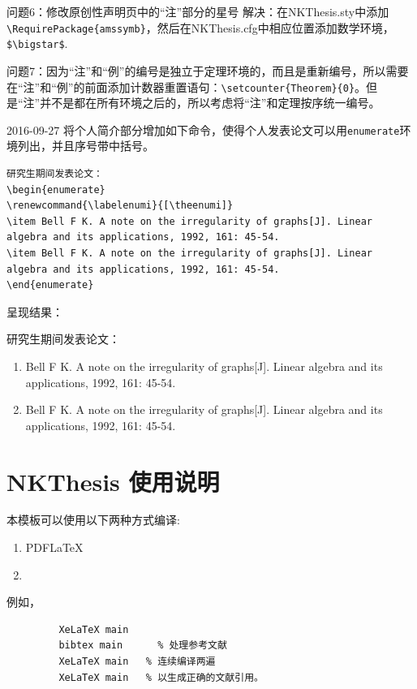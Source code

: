 问题6：修改原创性声明页中的“注”部分的星号
解决：在NKThesis.sty中添加\verb|\RequirePackage{amssymb}|，然后在NKThesis.cfg中相应位置添加数学环境，\verb|$\bigstar$|.

问题7：因为“注”和“例”的编号是独立于定理环境的，而且是重新编号，所以需要在“注”和“例”的前面添加计数器重置语句：\verb|\setcounter{Theorem}{0}|。但是“注”并不是都在所有环境之后的，所以考虑将“注”和定理按序统一编号。

2016-09-27
将个人简介部分增加如下命令，使得个人发表论文可以用\verb|enumerate|环境列出，并且序号带中括号。

\begin{verbatim}
研究生期间发表论文：
\begin{enumerate}
\renewcommand{\labelenumi}{[\theenumi]}
\item Bell F K. A note on the irregularity of graphs[J]. Linear algebra and its applications, 1992, 161: 45-54.
\item Bell F K. A note on the irregularity of graphs[J]. Linear algebra and its applications, 1992, 161: 45-54.
\end{enumerate}
\end{verbatim}

呈现结果：

研究生期间发表论文：
\begin{enumerate}
\renewcommand{\labelenumi}{[\theenumi]}
\item Bell F K. A note on the irregularity of graphs[J]. Linear algebra and its applications, 1992, 161: 45-54.
\item Bell F K. A note on the irregularity of graphs[J]. Linear algebra and its applications, 1992, 161: 45-54.
\end{enumerate}

\section{NKThesis 使用说明}

本模板可以使用以下两种方式编译:
\begin{enumerate}
 \item PDF\LaTeX

 \item \XeLaTeX [推荐]
\end{enumerate}

例如，
\begin{verbatim}
         XeLaTeX main
         bibtex main      % 处理参考文献
         XeLaTeX main   % 连续编译两遍
         XeLaTeX main   % 以生成正确的文献引用。
\end{verbatim}



